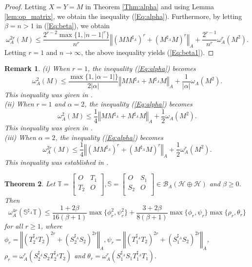 \documentclass{article}
\newcommand{\bra}[1]{\left(#1\right)}
\newcommand{\normA}[1]{{\left\Vert#1\right\Vert}_{A}}
\newcommand{\abs}[1]{\left\vert#1\right\vert}
\newcommand{\hh}{\mathcal{H}\oplus\mathcal{H}}
\newcommand {\Ma}{M^{\sharp_{A}}}
\newcommand {\T}{\mathbb{T}}
\renewcommand {\S}{\mathbb{S}}
\newcommand {\Sa}{\mathbb{S}^{\sharp_{A}}}
\renewcommand {\b}{\mathcal{B}}
\newcommand {\Toa}{T_{1}^{\sharp_{A}}}
\newcommand {\Soa}{S_{1}^{\sharp_{A}}}
\newcommand {\Tta}{T_{2}^{\sharp_{A}}}
\newcommand {\Sta}{S_{2}^{\sharp_{A}}}
\newtheorem{theorem}{Theorem}[section]
\newtheorem{remark}[theorem]{Remark}
\begin{document}
 \begin{proof}  Letting $X=Y=M$ in Theorem \ref{Thm:alpha} and using Lemma \ref{lem:op_matrix}, we obtain the inequality (\ref{Eq:alpha}).
 Furthermore, by letting $\beta=n>1$ in (\ref{Eq:beta}), we obtain
 $$\omega_A^{2r}(M)\leq \frac{2^{r-2}\max\{1,\abs{n-1}^{r}\}}{n^{r}}\normA{(M\Ma)^r+(\Ma M)^r}
   +\frac{2^{r-1}}{n^{r}}\omega_A^{r}(M^2).$$
 Letting  $r=1$ and $n\to\infty$, the above inequality yields (\ref{Eq:beta1}).
 \end{proof}
 \begin{remark} (i) When $r=1$, the inequality (\ref{Eq:alpha}) becomes
 \begin{equation}\label{Eq:alpha-2}
   \omega_A^{2}(M)\leq \frac{\max\{1,\abs{\alpha-1}\}}{2\abs{\alpha}}\normA{M\Ma+\Ma M}
   +\frac{1}{\abs{\alpha}}\omega_A(M^2).
 \end{equation}
 This inequality was given in \cite[Corollary 2.5]{KZ}.\\
 (ii) When $r=1$ and $\alpha=2$, the inequality (\ref{Eq:alpha}) becomes
 \begin{equation}\label{Eq:alpha-3}
   \omega_A^{2}(M)\leq \frac{1}{4}\normA{M\Ma+\Ma M}
   +\frac{1}{2}\omega_A(M^2).
 \end{equation}
 This inequality was given in \cite[Theorem 2.11]{Zamani-2}.\\
 (iii) When $\alpha=2$, the inequality (\ref{Eq:alpha}) becomes
 \begin{equation}\label{Eq:alpha-4}
   \omega_A^{2r}(M)\leq \frac{1}{4}\normA{(M\Ma)^r+(\Ma M)^r}
   +\frac{1}{2}\omega_A^{r}(M^2).
 \end{equation}
 This inequality was established in \cite[Theorem 2.16]{BPN}.
 \end{remark}
 \begin{theorem}\label{Thm:prod1} Let $\T=\begin{bmatrix} O& T_1\\ T_2& O \\\end{bmatrix}, \S=\begin{bmatrix} O& S_1\\ S_2& O \\\end{bmatrix}\in\b_A(\hh)$ and $\beta\geq 0$. Then
 \begin{equation}\label{Eq:prod1}
 \omega_A^{4r}\bra{\Sa \T}\leq \frac{1+2\beta}{16(\beta+1)}\max\{\phi_r^2,\psi_r^2\}+\frac{3+2\beta}{8(\beta+1)}\max\{\phi_r,\psi_r\}
 \max\{\rho_r,\theta_r\}
 \end{equation}
 for all $r\geq 1$, where $\phi_r=\normA{\bra{\Tta T_2}^{2r}+\bra{\Sta S_2}^{2r}},\psi_r=\normA{\bra{\Toa T_2}^{2r}+\bra{\Soa S_2}^{2r}}$,
 $\rho_r=\omega_A^{r}\bra{\Sta S_2\Tta T_2}$ and $\theta_r=\omega_A^{r}\bra{\Soa S_1\Toa T_1}$.
 \end{theorem}
\end{document}
